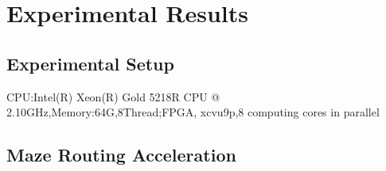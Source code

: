 \section{Experimental Results}\label{sec:experiment}
\subsection{Experimental Setup}

CPU:Intel(R) Xeon(R) Gold 5218R CPU @ 2.10GHz,Memory:64G,8Thread;FPGA, xcvu9p,8 computing cores in parallel


\subsection{Maze Routing Acceleration}

